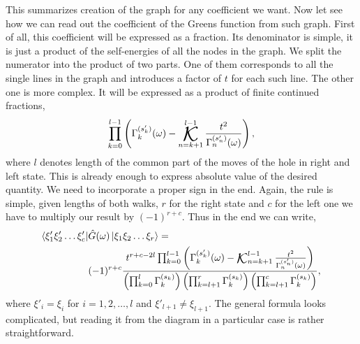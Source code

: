 \documentclass{article}
\newcommand{\ket}[1]{\left\vert #1 \right\rangle}
\newcommand{\bra}[1]{\left\langle #1 \right\vert}
\def\K{%
    \operatornamewithlimits{%
        \mathchoice{%
            \vcenter{\hbox{\huge $\mathcal{K}$}}%
        }{%
            \vcenter{\hbox{\Large $\mathcal{K}$}}%
        }{%
            \mathrm{\mathcal{K}}%
        }{%
            \mathrm{\mathcal{K}}%
        }
    }
}
\begin{document}
This summarizes creation of the graph for any coefficient we want. Now let see how we can read out the coefficient of the Greens function from such graph. First of all, this coefficient will be expressed as a fraction. Its denominator is simple, it is just a product of the self-energies of all the nodes in the graph. We split the numerator into the product of two parts. One of them corresponds to all the single lines in the graph and introduces a factor of $t$ for each such line. The other one is more complex. It will be expressed as a product of finite continued fractions,
\begin{equation}
    \prod_{k=0}^{l-1} \left(
        \Gamma_{k}^{(s'_k)}(\omega) - \K_{n=k+1}^{l-1} \frac{t^2}{\Gamma_{n}^{(s'_n)}(\omega)}
    \right),
\end{equation}
where $l$ denotes length of the common part of the moves of the hole in right and left state. This is already enough to express absolute value of the desired quantity. We need to incorporate a proper sign in the end. Again, the rule is simple, given lengths of both walks, $r$ for the right state and $c$ for the left one we have to multiply our result by $(-1)^{r+c}$. Thus in the end we can write,
\begin{equation}
\begin{split}
    \bra{\xi'_1 \xi'_2 \hdots \xi'_c}
    &\hat{G}(\omega)
    \ket{\xi_1 \xi_2 \hdots \xi_r} = \\
    &(-1)^{r+c}\frac{
    t^{r + c - 2l}
    \prod_{k=0}^{l-1} \left(
        \Gamma_{k}^{(s'_k)}(\omega) - \K_{n=k+1}^{l-1} \frac{t^2}{\Gamma_{n}^{(s'_n)}(\omega)}
    \right)
    }{
    \left(
        \prod_{k=0}^{l} \Gamma_k^{(s_k)}
    \right)
    \left(
        \prod_{k=l+1}^{r} \Gamma_k^{(s_k)}
    \right)
    \left(
        \prod_{k=l+1}^{c} \Gamma_k^{(s_k)}
    \right)
    },    
\end{split}
\end{equation}
where $\xi'_i = \xi_i$ for $i = 1,2,\hdots,l$ and  $\xi'_{l+1} \neq \xi_{l+1}$. The general formula looks complicated, but reading it from the diagram in a particular case is rather straightforward.
\end{document}
